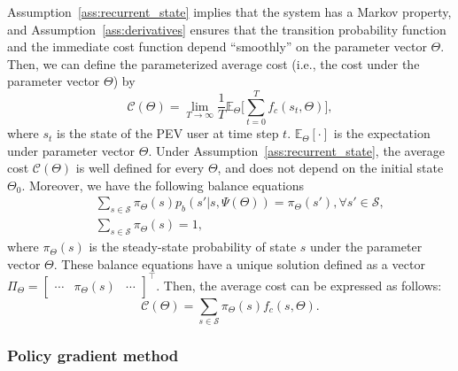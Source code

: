 \documentclass[twocolumn,10pt]{IEEEtran}
\begin{document}
Assumption~\ref{ass:recurrent_state} implies that the system has a Markov property, and Assumption~\ref{ass:derivatives} ensures that the transition probability function and the immediate cost function depend ``smoothly'' on the parameter vector $\Theta$. Then, we can define the parameterized average cost (i.e., the cost under the parameter vector $\Theta$) by
\begin{equation}
\mathcal{C} (\Theta) = \lim_{T\rightarrow \infty} \frac {1}{T} \mathbb{E}_{\Theta} \Big[ \sum_{t=0}^{T} f_c (s_t, \Theta)\Big] 	,
\end{equation}
where $s_t$ is the state of the PEV user at time step $t$. $\mathbb{E}_{\Theta}[ \cdot ]$ is the expectation under parameter vector $\Theta$. Under Assumption~\ref{ass:recurrent_state}, the average cost $\mathcal{C}(\Theta)$ is well defined for every $\Theta$, and does not depend on the initial state $\Theta_0$. Moreover, we have the following balance equations
\begin{eqnarray}
\label{eq: balance equation}
& & \sum_{s \in \mathcal{S}} \pi_{\Theta}({s}) p_b(s'|s,\Psi(\Theta)) = \pi_{\Theta}({s'}), \forall  s' \in \mathcal{S} 	,	\nonumber\\
& & \sum_{s \in \mathcal{S}} \pi_{\Theta}({s})  = 1	,
\end{eqnarray}
where $\pi_{\Theta}({s})$ is the steady-state probability of state $s$ under the parameter vector $\Theta$. These balance equations have a unique solution defined as a vector $\Pi_{\Theta} = \left[	\begin{array}{ccc}	\cdots	&	\pi_{\Theta}({s})	&	\cdots	\end{array}	\right]^\top$. Then, the average cost can be expressed as follows:
\begin{equation}
\label{eq:average throughput}
\mathcal{C} (\Theta) = \sum_{s \in \mathcal{S}} \pi_{\Theta}({s}) f_c (s, \Theta)	.
\end{equation}



\subsubsection{Policy gradient method}
\end{document}
